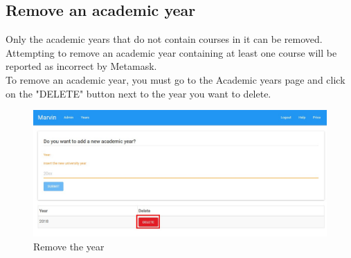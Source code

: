 \documentclass[ManualeUtente]{subfiles}
\begin{document}
\subsection{Remove an academic year}
Only the academic years that do not contain courses in it can be removed. Attempting to remove an academic year containing at least one course will be reported as incorrect by Metamask.\\
To remove an academic year, you must go to the Academic years page and click on the "DELETE" button next to the year you want to delete.
\begin{figure}[H]
	\centering
	\includegraphics[width=0.7\linewidth]{image/UniversityRemoveYear1}
	\caption[Add year form]{Remove the year}
	\label{fig:Remove the year}
\end{figure}
\end{document}
